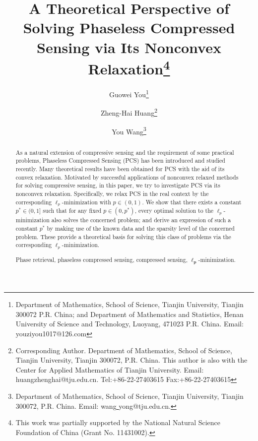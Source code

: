 \documentclass[12pt]{article}
\begin{document}
\title{A Theoretical Perspective of Solving Phaseless Compressed Sensing via Its Nonconvex Relaxation\thanks{This work was partially supported by the National Natural
Science Foundation of China (Grant No. 11431002).}
}

\author{
Guowei You\thanks{Department of Mathematics, School of Science, Tianjin University, Tianjin 300072 P.R. China; and Department of Mathematics and Statistics, Henan University of Science and Technology, Luoyang, 471023  P.R. China. Email: youziyou1017@126.com}
\and
Zheng-Hai Huang\thanks{Corresponding Author. Department of Mathematics, School of Science, Tianjin University, Tianjin 300072, P.R. China. This author is also with the Center for Applied Mathematics of Tianjin University. Email: huangzhenghai@tju.edu.cn.   Tel:+86-22-27403615 Fax:+86-22-27403615}
\and
You Wang\thanks{Department of Mathematics, School of Science, Tianjin University, Tianjin 300072, P.R. China. Email: wang\underline{ }yong@tju.edu.cn.}
}

\date{}%

\maketitle

\begin{abstract}
\noindent

As a natural extension of compressive sensing and the requirement of some practical problems, Phaseless Compressed Sensing (PCS) has been introduced and studied recently. Many theoretical results have been obtained for PCS with the aid of its convex relaxation. Motivated by successful applications of nonconvex relaxed methods for solving compressive sensing, in this paper, we try to investigate PCS via its nonconvex relaxation. Specifically, we relax PCS in the real context by the corresponding $\ell_p$-minimization with $p\in (0,1)$. We show that there exists a constant $p^\ast\in (0,1]$ such that for any fixed $p\in(0, p^\ast)$, every optimal solution to the $\ell_p$-minimization also solves the concerned problem; and derive an expression of such a constant $p^\ast$ by making use of the known data and the sparsity level of the concerned problem. These provide a theoretical basis for solving this class of problems via the corresponding $\ell_p$-minimization.
\vspace{3mm}

\hspace{2mm} Phase retrieval, phaseless compressed sensing, compressed sensing, $\mathbf{\ell_p}$-minimization. \vspace{3mm}

\end{abstract}
\end{document}
